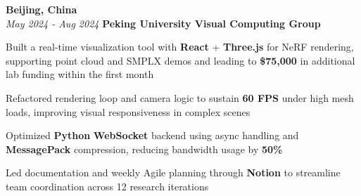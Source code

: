 \vspace{0.2cm}

\begin{twocolentry}{
    \textbf{Beijing, China} \\
    \textit{May 2024 - Aug 2024}
}{
    \textbf{Peking University Visual Computing Group} \\
}
\end{twocolentry}
\begin{onecolentry}
    \begin{highlights}
        \item Built a real-time visualization tool with \textbf{React} + \textbf{Three.js} for NeRF rendering, supporting point cloud and SMPLX demos and leading to \textbf{\$75,000} in additional lab funding within the first month
        \item Refactored rendering loop and camera logic to sustain \textbf{60 FPS} under high mesh loads, improving visual responsiveness in complex scenes
        \item Optimized \textbf{Python} \textbf{WebSocket} backend using async handling and \textbf{MessagePack} compression, reducing bandwidth usage by \textbf{50\%}
        \item Led documentation and weekly Agile planning through \textbf{Notion} to streamline team coordination across 12 research iterations
    \end{highlights}
\end{onecolentry}
